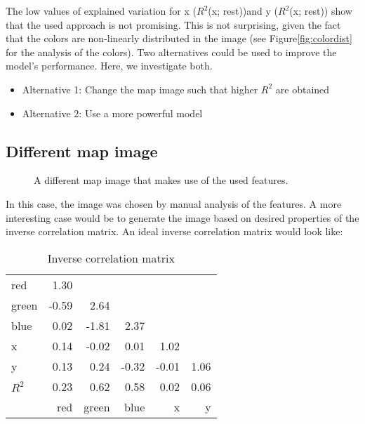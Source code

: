 The low values of explained variation for x ($R^2$(x; rest))and y
($R^2$(x; rest)) show that the used approach is not promising. This is
not surprising, given the fact that the colors are non-linearly
distributed in the image (see Figure\ref{fig:colordist} for the
analysis of the colors). Two alternatives could be used to improve the
model's performance. Here, we investigate both.
\begin{itemize}
\item Alternative 1: Change the map image such that higher $R^2$ are
  obtained
\item Alternative 2: Use a more powerful model
\end{itemize}


\subsection{Different map image}

\begin{figure}[h]
  \centering
  \caption{A different map image that makes use of the used features.}
  \label{fig:newmap}
\end{figure}

In this case, the image was chosen by manual analysis of the
features. A more interesting case would be to generate the image based
on desired properties of the inverse correlation matrix. 
An ideal inverse correlation matrix would look like:

\begin{table}                                   
\centering                                      
\begin{tabular}{l|rrrrr}                    
    red   & 1.30  &       &       &       &      \\  
    green & -0.59 & 2.64  &       &       &      \\
    blue  & 0.02  & -1.81 & 2.37  &       &      \\ 
    x     & 0.14  & -0.02 & 0.01  & 1.02  &      \\ 
    y     & 0.13  & 0.24  & -0.32 & -0.01 & 1.06 \\ 
  \midrule
  $R^2$   & 0.23  & 0.62  & 0.58  & 0.02  & 0.06 \\
  \midrule
          & red   & green & blue  & x     & y
\end{tabular}                                   
\caption{Inverse correlation matrix}                        
\label{table:MyTableLabel}                      
\end{table} 

